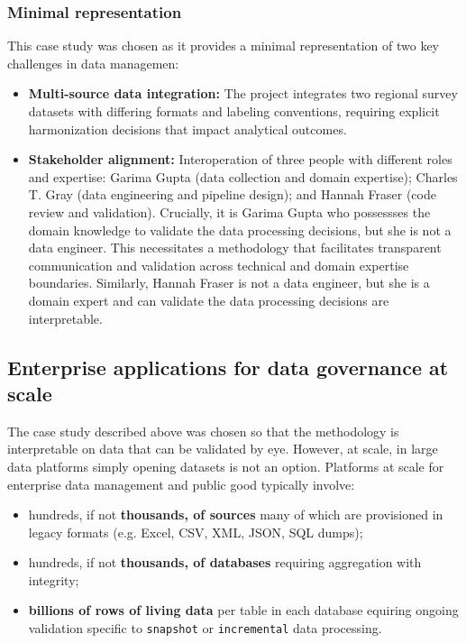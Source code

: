 \documentclass{article}
\begin{document}
\subsubsection{Minimal representation}

This case study was chosen as it provides a minimal representation of two key challenges in data managemen:

\begin{itemize}
  \item \textbf{Multi-source data integration:} The project integrates two regional survey datasets with differing formats and labeling conventions, requiring explicit harmonization decisions that impact analytical outcomes. 
  \item \textbf{Stakeholder alignment:} Interoperation of three people with different roles and expertise: Garima Gupta (data collection and domain expertise); Charles T. Gray (data engineering and pipeline design); and Hannah Fraser (code review and validation). Crucially, it is Garima Gupta who possessses the domain knowledge to validate the data processing decisions, but she is not a data engineer. This necessitates a methodology that facilitates transparent communication and validation across technical and domain expertise boundaries. Similarly, Hannah Fraser is not a data engineer, but she is a domain expert and can validate the data processing decisions are interpretable.
\end{itemize}

\subsection{Enterprise applications for data governance at scale}

The case study described above was chosen so that the methodology is interpretable on data that can be validated by eye. However, at scale, in large data platforms simply opening datasets is not an option. Platforms at scale for enterprise data management and public good typically involve:

\begin{itemize}
  \item hundreds, if not  \textbf{thousands, of sources} many of which are provisioned in legacy formats (e.g. Excel, CSV, XML, JSON, SQL dumps);
  \item hundreds, if not \textbf{thousands, of databases} requiring aggregation with integrity;
  \item \textbf{billions of rows of living data} per table in each database equiring ongoing validation specific to \texttt{snapshot} or \texttt{incremental} data processing.
\end{itemize}
\end{document}
